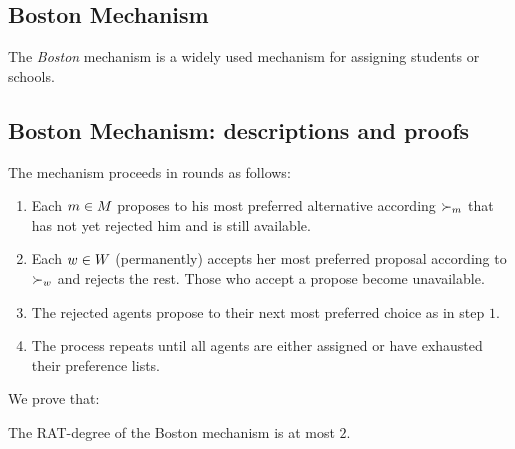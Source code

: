 \subsection{Boston Mechanism}
The \emph{Boston} mechanism \cite{abdulkadirouglu2003school} is a widely used mechanism for assigning students or schools. 
\begin{toappendix}
\subsection{Boston Mechanism: descriptions and proofs}
The mechanism proceeds in rounds as follows:
\begin{enumerate}
    \item Each $m \in M$ proposes to his most preferred alternative according $\succ_{m}$ that has not yet rejected him and is still available.

    \item Each $w \in W$ (permanently) accepts her most preferred proposal according to $\succ_{w}$ and rejects the rest. Those who accept a propose become unavailable. 

    \item The rejected agents propose to their next most preferred choice as in step $1$.

    \item The process repeats until all agents are either assigned or have exhausted their preference lists.
\end{enumerate}

\end{toappendix}
We prove that:

\begin{theoremrep}
    \label{prop-boston}
    The RAT-degree of the Boston mechanism is at most $2$.
\end{theoremrep}

